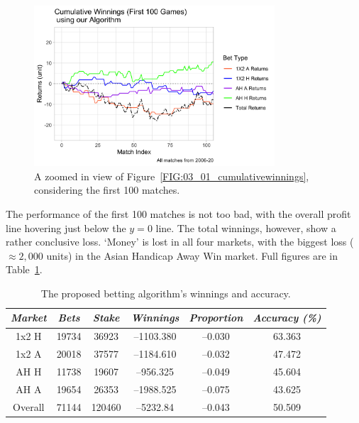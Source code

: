 \documentclass[a4paper,10pt]{report}
\begin{document}
\begin{figure}[h!]\begin{center}
	\includegraphics[width=0.8\textwidth]{model_02.png}  
	\caption{A zoomed in view of Figure~\ref{FIG:03_01_cumulativewinnings}, considering the first 100 matches.}\label{FIG:03_02_cumulativewinnings100}
\end{center}\end{figure}

The performance of the first 100 matches is not too bad, with the overall profit line hovering just below the $y=0$ line. The total winnings, however, show a rather conclusive loss. `Money' is lost in all four markets, with the biggest loss ($\approx 2,000$ units) in the Asian Handicap Away Win market. Full figures are in Table~\ref{tab:betaccuracy}.

\begin{table}[h!]\begin{center}\begin{tabular}{c||cc|cc|c}
\textit{Market}	& \textit{Bets} & \textit{Stake}	& \textit{Winnings}	& \textit{Proportion}& \textit{Accuracy (\%)}  \\ \hline \hline
1x2 H&	19734&	 36923&	--1103.380&	--0.030&	63.363\\
1x2 A&	20018&	 37577&	--1184.610&	--0.032&	47.472\\
AH H&	11738&	 19607&	 --956.325&	--0.049&	45.604\\
AH A&	19654&	 26353&	--1988.525&	--0.075&	43.625\\ \hdashline
Overall&71144&	120460&	 --5232.84&	--0.043& 	50.509
\end{tabular}\end{center}\caption{The proposed betting algorithm's winnings and accuracy.}\label{tab:betaccuracy}
\end{table}
\end{document}
